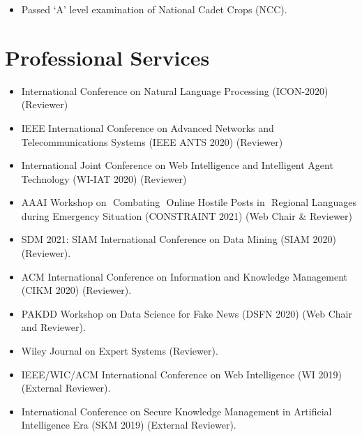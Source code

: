 \documentclass[margin, centered]{res}
\begin{document}
\begin{resume}
\begin{itemize}[leftmargin=*]
 \item Passed `A' level examination of National Cadet Crops (NCC).
\end{itemize}

\section{Professional Services}
\begin{itemize}[leftmargin=*]
    \item International Conference on Natural Language Processing (ICON-2020) (Reviewer)
    \item IEEE International Conference on Advanced Networks and Telecommunications Systems (IEEE ANTS 2020) (Reviewer)
    \item International Joint Conference on Web Intelligence and Intelligent Agent Technology (WI-IAT 2020) (Reviewer)
	\item AAAI Workshop on ​ Combating ​ On​line Ho​st​ile Posts in ​ Regional L​anguages dur​ing Emerge​ncy Si​tuation (CONSTRAINT 2021) (Web Chair & Reviewer)
	\item SDM 2021: SIAM International Conference on Data Mining (SIAM 2020) (Reviewer).
	\item ACM International Conference on Information and Knowledge Management (CIKM 2020) (Reviewer).
	\item PAKDD Workshop on Data Science for Fake News (DSFN 2020) (Web Chair and Reviewer).
	\item Wiley Journal on Expert Systems (Reviewer).
	\item IEEE/WIC/ACM International Conference on Web Intelligence (WI 2019) (External Reviewer).
	\item International Conference on Secure Knowledge Management in Artificial Intelligence Era (SKM 2019) (External Reviewer).
\end{itemize}


\end{resume}
\end{document}
